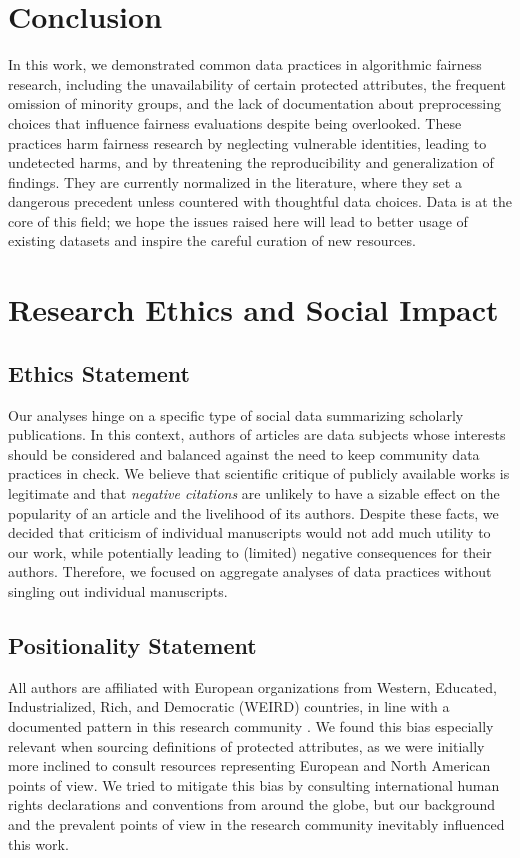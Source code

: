 \section{Conclusion} \label{sec:conclusion}

In this work, we demonstrated common data practices in algorithmic fairness research, including the unavailability of certain protected attributes, the frequent omission of minority groups, and the lack of documentation about preprocessing choices that influence fairness evaluations despite being overlooked. These practices harm fairness research by neglecting vulnerable identities, leading to undetected harms, and by threatening the reproducibility and generalization of findings. They are currently normalized in the literature, where they set a dangerous precedent unless countered with thoughtful data choices. Data is at the core of this field; we hope the issues raised here will lead to better usage of existing datasets and inspire the careful curation of new resources.

\section*{Research Ethics and Social Impact}

\subsection*{Ethics Statement}
Our analyses hinge on a specific type of social data summarizing scholarly publications. In this context, authors of articles are data subjects whose interests should be considered and balanced against the need to keep community data practices in check. We believe that scientific critique of publicly available works is legitimate and that \emph{negative citations} are unlikely to have a sizable effect on the popularity of an article \citep{catalini2015incidence} and the livelihood of its authors. Despite these facts, we decided that criticism of individual manuscripts would not add much utility to our work, while potentially leading to (limited) negative consequences for their authors. Therefore, we focused on aggregate analyses of data practices without singling out individual manuscripts.

\subsection*{Positionality Statement}
All authors are affiliated with European organizations from Western, Educated, Industrialized, Rich, and Democratic (WEIRD) countries, in line with a documented pattern in this research community \citep{septiandri2023weird}. We found this bias especially relevant when sourcing definitions of protected attributes, as we were initially more inclined to consult resources representing European and North American points of view. We tried to mitigate this bias by consulting international human rights declarations and conventions from around the globe, but our background and the prevalent points of view in the research community inevitably influenced this work. 


